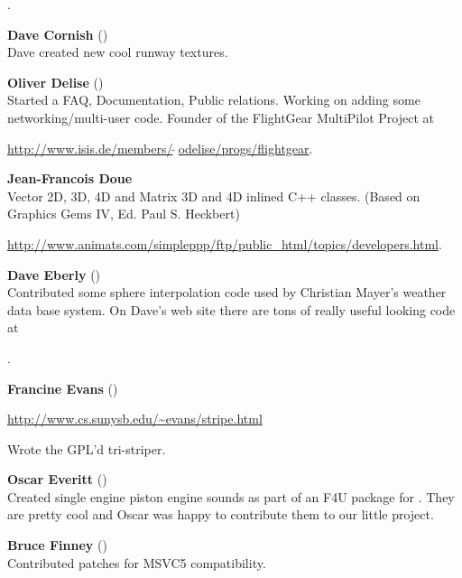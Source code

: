  .
 \medskip

\noindent \textbf{Dave Cornish} ()\\
 Dave created new cool runway textures.
 \medskip

\noindent \textbf{Oliver Delise}  ()\\
 Started a FAQ, Documentation, Public relations. Working on adding some
  networking/multi-user code. Founder of the FlightGear MultiPilot
  Project at
   \medskip

  \href{http://www.isis.de/members/~odelise/progs/flightgear}{http://www.isis.de/members/$\tilde{~~}$odelise/progs/flightgear}.
\medskip

\noindent \textbf{Jean-Francois Doue}\\
  Vector 2D, 3D, 4D and Matrix 3D and 4D inlined C++ classes.  (Based on
  Graphics Gems IV, Ed. Paul S. Heckbert)
  \medskip

\href{http://www.animats.com/simpleppp/ftp/public_html/topics/developers.html}{http://www.animats.com/simpleppp/ftp/public\_html/topics/developers.html}.
 \medskip

\noindent \textbf{Dave Eberly}  ()\\
  Contributed some sphere interpolation code used by Christian Mayer's
  weather data base system.  On Dave's web site there are tons of
  really useful looking code at
   \medskip

  .
  \medskip

\noindent \textbf{Francine Evans} ()
 \medskip

\href{http://www.cs.sunysb.edu/~evans/stripe.html}{http://www.cs.sunysb.edu/\~{}evans/stripe.html}
\medskip

  \noindent
  Wrote the GPL'd tri-striper.
 \medskip

\noindent \textbf{Oscar Everitt} ()\\
  Created single engine piston engine sounds as part of an F4U package
  for .  They are pretty cool and Oscar was happy to contribute
  them to our little project.
 \medskip

\noindent \textbf{Bruce Finney} ()\\
  Contributed patches for MSVC5 compatibility.
 \medskip

